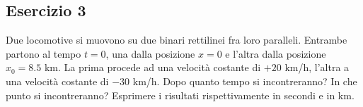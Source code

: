 \documentclass[12pt,a4paper]{book}
\begin{document}


\subsection*{Esercizio 3}
Due locomotive si muovono su due binari rettilinei fra loro paralleli. Entrambe partono al tempo $t=0$, una dalla posizione $x=0$ e l’altra dalla posizione $x_0=8.5$ km. La prima procede ad una velocità costante di $+20$ km/h, l’altra a una velocità costante di $-30$ km/h. Dopo quanto tempo si incontreranno? In che punto si incontreranno? Esprimere i risultati rispettivamente in secondi e in km.
\end{document}
